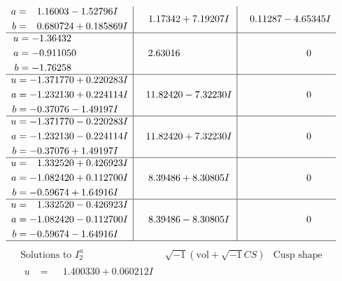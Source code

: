 \documentclass[1p]{elsarticle_modified}
\theoremstyle{definition}
\newcommand{\I}{\sqrt{-1}}
\begin{document}
$$\begin{array}{c|c|c}
\begin{aligned}
a &= \phantom{-}1.16003 - 1.52796 I \\
b &= \phantom{-}0.680724 + 0.185869 I\end{aligned}
 & \phantom{-}1.17342 + 7.19207 I & \phantom{-}0.11287 - 4.65345 I \\ \hline\begin{aligned}
u &= -1.36432\phantom{ +0.000000I} \\
a &= -0.911050\phantom{ +0.000000I} \\
b &= -1.76258\phantom{ +0.000000I}\end{aligned}
 & \phantom{-}2.63016\phantom{ +0.000000I} & \phantom{-0.000000 } 0 \\ \hline\begin{aligned}
u &= -1.371770 + 0.220283 I \\
a &= -1.232130 + 0.224114 I \\
b &= -0.37076 - 1.49197 I\end{aligned}
 & \phantom{-}11.82420 - 7.32230 I & \phantom{-0.000000 } 0 \\ \hline\begin{aligned}
u &= -1.371770 - 0.220283 I \\
a &= -1.232130 - 0.224114 I \\
b &= -0.37076 + 1.49197 I\end{aligned}
 & \phantom{-}11.82420 + 7.32230 I & \phantom{-0.000000 } 0 \\ \hline\begin{aligned}
u &= \phantom{-}1.332520 + 0.426923 I \\
a &= -1.082420 + 0.112700 I \\
b &= -0.59674 + 1.64916 I\end{aligned}
 & \phantom{-}8.39486 + 8.30805 I & \phantom{-0.000000 } 0 \\ \hline\begin{aligned}
u &= \phantom{-}1.332520 - 0.426923 I \\
a &= -1.082420 - 0.112700 I \\
b &= -0.59674 - 1.64916 I\end{aligned}
 & \phantom{-}8.39486 - 8.30805 I & \phantom{-0.000000 } 0\\
 \hline 
 \end{array}$$\newpage$$\begin{array}{c|c|c}  
\text{Solutions to }I^u_{2}& \I (\text{vol} + \sqrt{-1}CS) & \text{Cusp shape}\\
 \hline 
\begin{aligned}
u &= \phantom{-}1.400330 + 0.060212 I \\

\end{aligned}
\end{array}$$
\end{document}
